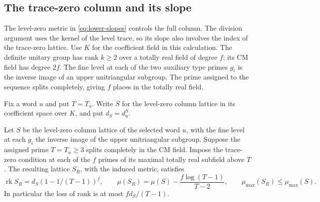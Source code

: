 \subsection{The trace-zero column and its slope}
\label{sec:ramified-column}

The level-zero metric in \eqref{eq:lower-slopes} controls the full column. The division argument uses the kernel of the level trace, so its slope also involves the index of the trace-zero lattice. Use \(K\) for the coefficient field in
this calculation. The definite unitary group has rank \(k\ge2\) over a
totally real field of degree \(f\); its CM field has degree \(2f\).
The fine level at each of the two auxiliary type primes \(g_i\)
is the inverse image of an upper unitriangular subgroup. The prime assigned to the sequence splits completely, giving \(f\) places in the totally real field.

Fix a word \(u\) and put \(T=T_u\). Write \(S\) for the level-zero
column lattice in its coefficient space over \(K\), and put
\(d_S=d_u^S\).

\begin{proposition}\label{prop:trace-zero-column}
Let \(S\) be the level-zero column lattice of the selected
word \(u\), with the fine level at each \(g_i\) the inverse image
of the upper unitriangular subgroup. Suppose the assigned
prime \(T=T_u\ge3\) splits completely in the CM field. Impose the trace-zero condition at each of the \(f\) primes of its maximal totally real subfield above \(T\). The resulting lattice \(S_R\), with the
induced metric, satisfies
\[
 \operatorname{rk} S_R=d_S(1-1/(T-1))^f,\qquad
 \mu(S_R)=\mu(S)-\frac{f\log(T-1)}{T-2},\qquad
 \mu_{\max}(S_R)\le\mu_{\max}(S).
\]
In particular the loss of rank is at most \(f d_S/(T-1)\).
\end{proposition}

